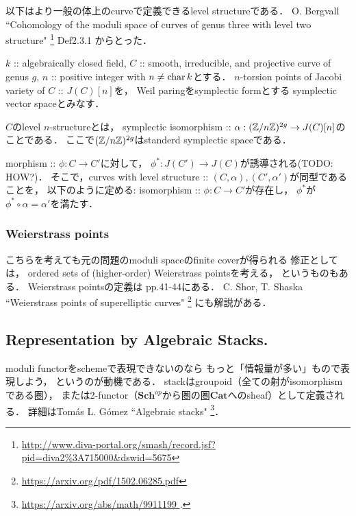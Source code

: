 \documentclass[a4paper]{jsarticle}
\newcommand{\Sch}{\mathbf{Sch}}
\newcommand{\Cat}{\mathbf{Cat}}
\begin{document}
    以下はより一般の体上のcurveで定義できるlevel structureである．
    O. Bergvall
    ``Cohomology of the moduli space of curves of genus three with level two structure" 
    \footnote{\url{http://www.diva-portal.org/smash/record.jsf?pid=diva2\%3A715000&dswid=5675}}
    Def2.3.1
    からとった．
    \begin{Def}[]
        $k$ :: algebraically closed field,
        $C$ :: smooth, irreducible, and projective curve of genus $g$,
        $n$ :: positive integer with $n \neq \operatorname{char} k$とする．
        $n$-torsion points of Jacobi variety of $C$ :: $J(C)[n]$を，
        Weil paringをsymplectic formとする
        symplectic vector spaceとみなす．

        $C$のlevel $n$-structureとは，
        symplectic isomorphism :: $\alpha: (\mathbb{Z}/n\mathbb{Z})^{2g} \to J(C)[n]$のことである．
        ここで$(\mathbb{Z}/n\mathbb{Z})^{2g}$はstanderd symplectic spaceである．

        morphism :: $\phi: C \to C'$に対して，
        $\phi^*: J(C') \to J(C)$が誘導される(TODO: HOW?)．
        そこで，curves with level structure :: $(C, \alpha), (C', \alpha')$が同型であることを，
        以下のように定める:
        isomorphism :: $\phi: C \to C'$が存在し，
        $\phi^*$が$\phi^* \circ \alpha=\alpha'$を満たす．
    \end{Def}

    \subsubsection{ Weierstrass points }
    こちらを考えても元の問題のmoduli spaceのfinite coverが得られる
    修正としては，
    ordered sets of (higher-order) Weierstrass pointsを考える，
    というものもある．
    Weierstrass pointsの定義は\cite{GAC} pp.41-44にある．
    C. Shor, T. Shaska ``Weierstrass points of superelliptic curves"
    \footnote{\url{https://arxiv.org/pdf/1502.06285.pdf}}
    にも解説がある．

    \subsection{Representation by Algebraic Stacks.}
    moduli functorをschemeで表現できないのなら
    もっと「情報量が多い」もので表現しよう，
    というのが動機である．
    stackはgroupoid（全ての射がisomorphismである圏），
    または2-functor（$\Sch^{op}$から圏の圏$\Cat$へのsheaf）として定義される．
    詳細はTom\'as L. G\'omez ``Algebraic stacks"
    \footnote{ \url{ https://arxiv.org/abs/math/9911199 }. }．



\end{document}
